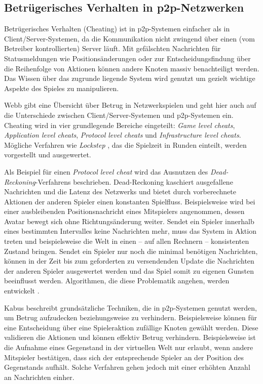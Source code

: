 \subsection{Betrügerisches Verhalten in p2p-Netzwerken}
\label{chap:grundlagen:cheating}
Betrügerisches Verhalten (Cheating) ist in p2p-Systemen einfacher als in Client/Server-Systemen, da die Kommunikation nicht zwingend über einen (vom Betreiber kontrollierten) Server läuft. Mit gefälschten Nachrichten für Statusmeldungen wie Positionsänderungen oder zur Entscheidungsfindung über die Reihenfolge von Aktionen können andere Knoten massiv benachteiligt werden. Das Wissen über das zugrunde liegende System wird genutzt um gezielt wichtige Aspekte des Spieles zu manipulieren.

Webb \cite{Webb2007Cheating} gibt eine Übersicht über Betrug in Netzwerkspielen und geht hier auch auf die Unterschiede zwischen Client/Server-Systemen und p2p-Systemen ein. Cheating wird in vier grundlegende Bereiche eingeteilt: \emph{Game level cheats}, \emph{Application level cheats}, \emph{Protocol level cheats} und \emph{Infrastructure level cheats}. Mögliche Verfahren wie \emph{Lockstep} \cite{Baughman2007}, das die Spielzeit in Runden einteilt, werden vorgestellt und ausgewertet.

Als Beispiel für einen \emph{Protocol level cheat} wird das Ausnutzen des \emph{Dead-Reckoning}-Verfahrens \cite{Pantel2002} beschrieben. Dead-Reckoning kaschiert ausgefallene Nachrichten und die Latenz des Netzwerks und bietet durch vorberechnete Aktionen der anderen Spieler einen konstanten Spielfluss. Beispielsweise wird bei einer ausbleibenden Positionsnachricht eines Mitspielers angenommen, dessen Avatar bewegt sich ohne Richtungsänderung weiter. Sendet ein Spieler innerhalb eines bestimmten Intervalles keine Nachrichten mehr, muss das System in Aktion treten und beispielsweise die Welt in einen -- auf allen Rechnern -- konsistenten Zustand bringen. Sendet ein Spieler nur noch die minimal benötigen Nachrichten, können in der Zeit bis zum geforderten zu versendenden Update die Nachrichten der anderen Spieler ausgewertet werden und das Spiel somit zu eigenen Gunsten beeinflusst werden. Algorithmen, die diese Problematik angehen, werden entwickelt \cite{Aggarwal2005}.

Kabus \cite{Kabus2007Design, Kabus2009} beschreibt grundsätzliche Techniken, die in p2p-Systemen genutzt werden, um Betrug aufzudecken beziehungsweise zu verhindern. Beispielsweise können für eine Entscheidung über eine Spieleraktion zufällige Knoten gewählt werden. Diese validieren die Aktionen und können effektiv Betrug verhindern. Beispielsweise ist die Aufnahme eines Gegenstand in der virtuellen Welt nur erlaubt, wenn andere Mitspieler bestätigen, dass sich der entsprechende Spieler an der Position des Gegenstands aufhält. Solche Verfahren gehen jedoch mit einer erhöhten Anzahl an Nachrichten einher.

